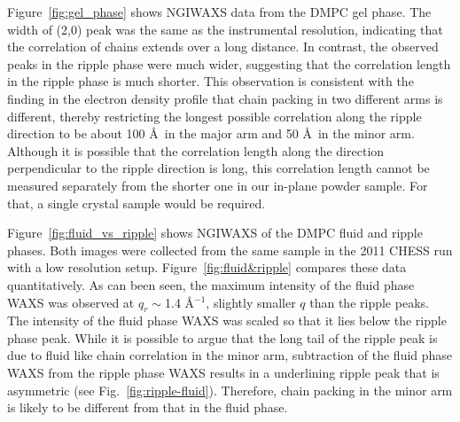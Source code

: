 Figure~\ref{fig:gel_phase} shows NGIWAXS data from the DMPC gel phase.
The width of (2,0) peak was the same as the instrumental resolution, 
indicating that the correlation of chains extends over a long distance.
In contrast, the observed peaks in the ripple phase were much wider,
suggesting that the correlation length in the ripple phase is much shorter.
This observation is consistent with the finding in the electron density profile
that chain packing in two different arms is different, thereby restricting 
the longest possible correlation along the ripple direction to be about 
100 \AA\ in the major arm and 50 \AA\ in the minor arm. Although
it is possible that the correlation length along the direction perpendicular
to the ripple direction is long, this correlation length cannot be measured
separately from the shorter one in our in-plane powder sample. For that,
a single crystal sample would be required.

Figure~\ref{fig:fluid_vs_ripple} shows NGIWAXS of the DMPC fluid and ripple phases.
Both images were collected from the same sample in the 2011 CHESS run with 
a low resolution setup. Figure~\ref{fig:fluid&ripple} compares these data 
quantitatively. As can been seen, the maximum intensity of the fluid phase
WAXS was observed at $q_r \sim$1.4 \AA$^{-1}$, slightly smaller $q$ than 
the ripple peaks. The intensity of the fluid phase WAXS was scaled so that
it lies below the ripple phase peak. While it is possible to argue that 
the long tail of the ripple peak is due to fluid like chain correlation
in the minor arm, subtraction of the fluid phase WAXS from the ripple phase
WAXS results in a underlining ripple peak that is asymmetric (see Fig.~\ref{fig:ripple-fluid}).
Therefore, chain packing in the minor arm is likely to be different from that 
in the fluid phase.

